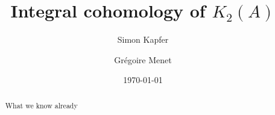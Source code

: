 \documentclass{amsart}
\newcommand{\kum}[2]{K_{ #2 }( #1 )}
\theoremstyle{plain}
\theoremstyle{definition}
\theoremstyle{remark}
\begin{document}
\title{Integral cohomology of $\kum{A}{2}$}


\author{Simon Kapfer}
\author{Gr\'egoire Menet}
\address{Simon Kapfer, Institut f\"ur Mathematik, Universit\"at Augsburg, D--86159 Augsburg}


\date{\today}


\begin{abstract} 
What we know already
\end{abstract}

\maketitle
\end{document}

